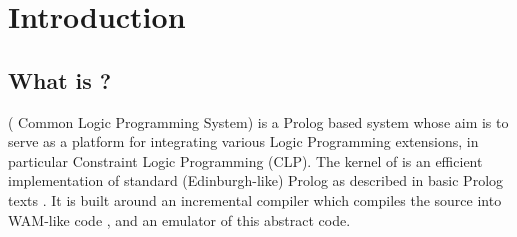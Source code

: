 %
%
%
%
%
%
%

\chapter{Introduction}
\label{chapintro}

\section{What is {\eclipse} ?}
{\eclipse}{} ({\eclipse} Common Logic Programming System)
is a Prolog based system whose aim is to serve as a platform
for integrating various Logic Programming extensions, in particular
Constraint Logic Programming (CLP).
The kernel of {\eclipse} is an efficient implementation of standard
(Edinburgh-like) Prolog as described in basic Prolog texts \cite{clocksin81}.
It is built around an incremental compiler which compiles the {\eclipse}
source into WAM-like code \cite{warren83}, and an emulator of this abstract code.

